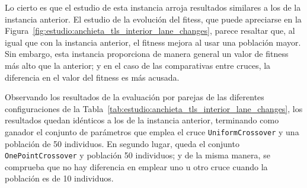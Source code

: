 Lo cierto es que el estudio de esta instancia arroja resultados similares a los de la instancia anterior. El estudio de la evolución del fitess, que puede apreciarse en la Figura~\ref{fig:estudio:anchieta_tls_interior_lane_changes}, parece resaltar que, al igual que con la instancia anterior, el fitness mejora al usar una población mayor. Sin embargo, esta instancia proporciona de manera general un valor de fitness más alto que la anterior; y en el caso de las comparativas entre cruces, la diferencia en el valor del fitness es más acusada.

Observando los resultados de la evaluación por parejas de las diferentes configuraciones de la Tabla~\ref{tab:estudio:anchieta_tls_interior_lane_changes}, los resultados quedan idénticos a los de la instancia anterior, terminando como ganador el conjunto de parámetros que emplea el cruce \texttt{UniformCrossover} y una población de 50 individuos. En segundo lugar, queda el conjunto \texttt{OnePointCrossover} y población 50 individuos; y de la misma manera, se comprueba que no hay diferencia en emplear uno u otro cruce cuando la población es de 10 individuos.

